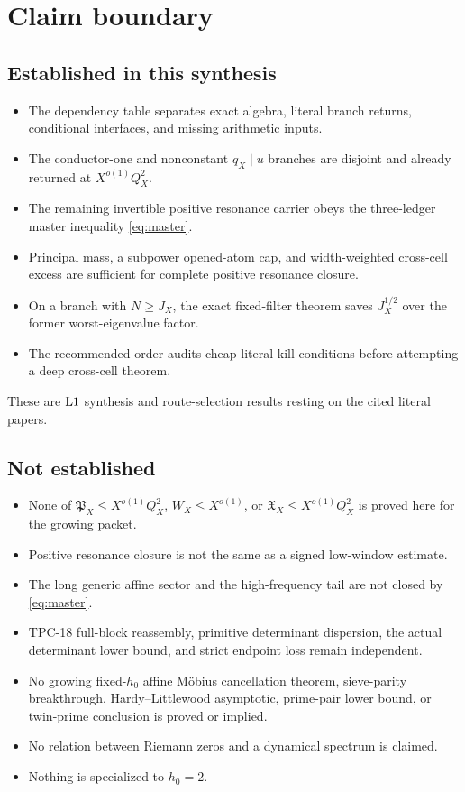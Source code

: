 \section{Claim boundary}
\label{sec:claim-boundary}

\subsection*{Established in this synthesis}

\begin{itemize}[leftmargin=2em]
\item The dependency table separates exact algebra, literal branch
  returns, conditional interfaces, and missing arithmetic inputs.
\item The conductor-one and nonconstant \(q_X\mid u\) branches are
  disjoint and already returned at \(X^{o(1)}Q_X^2\).
\item The remaining invertible positive resonance carrier obeys the
  three-ledger master inequality \eqref{eq:master}.
\item Principal mass, a subpower opened-atom cap, and
  width-weighted cross-cell excess are sufficient for complete
  positive resonance closure.
\item On a branch with \(N\ge J_X\), the exact fixed-filter theorem
  saves \(J_X^{1/2}\) over the former worst-eigenvalue factor.
\item The recommended order audits cheap literal kill conditions
  before attempting a deep cross-cell theorem.
\end{itemize}

These are \(\mathrm{L1}\) synthesis and route-selection results resting on
the cited literal papers.

\subsection*{Not established}

\begin{itemize}[leftmargin=2em]
\item None of
  \(\mathfrak P_X\le X^{o(1)}Q_X^2\),
  \(W_X\le X^{o(1)}\), or
  \(\mathfrak X_X\le X^{o(1)}Q_X^2\)
  is proved here for the growing packet.
\item Positive resonance closure is not the same as a signed
  low-window estimate.
\item The long generic affine sector and the high-frequency tail are
  not closed by \eqref{eq:master}.
\item TPC-18 full-block reassembly, primitive determinant
  dispersion, the actual determinant lower bound, and strict
  endpoint loss remain independent.
\item No growing fixed-\(h_0\) affine M\"obius cancellation theorem,
  sieve-parity breakthrough, Hardy--Littlewood asymptotic,
  prime-pair lower bound, or twin-prime conclusion is proved or
  implied.
\item No relation between Riemann zeros and a dynamical spectrum is
  claimed.
\item Nothing is specialized to \(h_0=2\).
\end{itemize}

